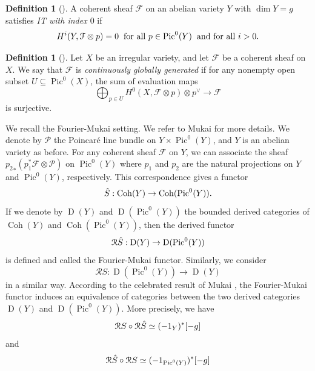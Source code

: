 \documentclass[sn-mathphys-num]{sn-jnl}%
\theoremstyle{definition}
\newtheorem{defn}[theorem]{Definition}
\numberwithin{equation}{section}
\begin{document}
\begin{defn}[{\cite[Definition 2.3]{popasurvey}}]\label{itdefn}
    A coherent sheaf $\mathcal{F}$ on an abelian variety $Y$ with $\dim Y = g$ satisfies \emph{IT with index $0$} if 
\[
H^{i}(Y, \mathcal{F} \otimes p) = 0 \hspace{0.2cm} \text{for all } p \in \operatorname{Pic}^{0}(Y) \hspace{0.2cm} \text{and for all } i > 0.
\]
\end{defn}
\begin{defn}[{\cite[Definition 2.10]{popapareschi1}}]\label{continousdefinition}
    Let $X$ be an irregular variety, and let $\mathcal{F}$ be a coherent sheaf on $X$. We say that $\mathcal{F}$ is \emph{continuously globally generated} if for any nonempty open subset $U \subseteq \operatorname{Pic}^{0}(X)$,  the sum of
evaluation maps
\[
\bigoplus_{p \in U} H^{0}(X, \mathcal{F} \otimes p) \otimes p^{\vee} \to \mathcal{F}
\]
is surjective.
\end{defn}
\par We recall the Fourier-Mukai setting. We refer to Mukai \cite{Mukai} for more details. We denote by $\mathcal{P}$ the Poincaré line bundle on $Y \times \operatorname{Pic}^{0}(Y)$, and $Y$ is an abelian variety as before. For any coherent sheaf $\mathcal{F}$ on $Y$, we can associate the sheaf ${p_{2}}_{*}(p_{1}^{*}\mathcal{F} \otimes \mathcal{P})$ on $\operatorname{Pic}^{0}(Y)$ where
$p_{1}$ and $p_{2}$ are the natural projections on $Y$ and $\operatorname{Pic}^{0}(Y)$, respectively. This correspondence gives a
functor
\[
\Hat{S}: \operatorname{Coh}(Y) \to \operatorname{Coh}(\operatorname{Pic}^{0}(Y)).
\]
If we denote by $\operatorname{D}(Y)$ and $\operatorname{D}(\operatorname{Pic}^{0}(Y))$ the bounded derived categories of $\operatorname{Coh}(Y)$ and
$\operatorname{Coh}(\operatorname{Pic}^{0}(Y))$, then the derived functor $$\mathcal{R}\Hat{S}: \operatorname{D}(Y) \to \operatorname{D}(\operatorname{Pic}^{0}(Y))$$  is defined and called the
Fourier-Mukai functor. Similarly, we consider $$\mathcal{R}S : \operatorname{D}(\operatorname{Pic}^{0}(Y))  \to \operatorname{D}(Y)$$ in a similar
way. According to the celebrated result of Mukai \cite[Theorem 2.2]{Mukai}, the Fourier-Mukai functor induces an equivalence of categories between the two derived categories  $\operatorname{D}(Y)$ and $\operatorname{D}(\operatorname{Pic}^{0}(Y))$. More precisely, we have
\[
\mathcal{R}S \circ \mathcal{R}\Hat{S} \simeq (-1_{Y})^{*}[-g]
\]
and 
\[
\mathcal{R}\Hat{S} \circ \mathcal{R}S \simeq (-1_{\operatorname{Pic}^{0}(Y)})^{*}[-g]
\]
\end{document}
